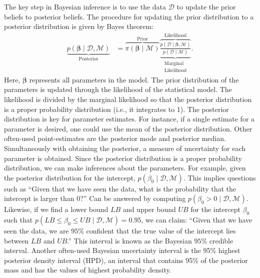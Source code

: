 \documentclass[a4paper]{article}
\newcommand{\prob}[1]{p\left(#1\right)}
\newcommand{\lik}[1]{p\left(#1\right)}
\newcommand{\data}{\mathcal{D}}
\newcommand{\model}{\mathcal{M}}
\newcommand{\prior}[1]{\pi\left(#1\right)}
\begin{document}
The key step in Bayesian inference is to use the data $\data$ to update the prior beliefs to posterior beliefs. The procedure for updating the prior distribution to a posterior distribution is given by Bayes theorem:
\begin{align*}\label{eq:BayesTheorem}
\underbrace{\prob{\bm{\beta} \mid \data , \model}}_{\text{Posterior}}
&= 
\overbrace{\prior{\bm{\beta}\mid \model}}^{\text{Prior}}
\underbrace{\overbrace{
		\frac{\lik{\data \mid \bm{\beta}, \model}}{\prob{\data \mid \model}}
	}^{\text{Likelihood}}}_{\substack{\text{Marginal}\\ \text{Likelihood}}}.
\end{align*}
Here, $\bm{\beta}$ represents all parameters in the model. The prior distribution of the parameters is updated through the likelihood of the statistical model. The likelihood is divided by the marginal likelihood so that the posterior distribution is a proper probability distribution (i.e., it integrates to 1). The posterior distribution is key for parameter estimates. For instance, if a single estimate for a parameter is desired, one could use the mean of the posterior distribution. Other often-used point-estimates are the posterior mode and posterior median. Simultaneously with obtaining the posterior, a measure of uncertainty for each parameter is obtained. Since the posterior distribution is a proper probability distribution, we can make inferences about the parameters. For example, given the posterior distribution for the intercept, $\prob{\beta_0 \mid \data , \model}$. This implies questions such as ``Given that we have seen the data, what is the probability that the intercept is larger than 0?'' Can be answered by computing $\prob{\beta_0 > 0 \mid \data , \model}$. Likewise, if we find a lower bound $LB$ and upper bound $UB$ for the intercept $\beta_0$ such that $\prob{ LB \leq \beta_0 \leq UB \mid \data , \model} = 0.95$, we can claim: ``Given that we have seen the data, we are $95\%$ confident that the true value of the intercept lies between $LB$ and $UB$.'' This interval is known as the Bayesian $95\%$ credible interval. Another often-used Bayesian uncertainty interval is the 95\% highest posterior density interval (HPD), an interval that contains 95\% of the posterior mass and has the values of highest probability density.
\end{document}
